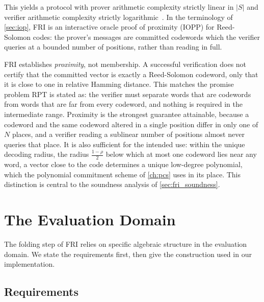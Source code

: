 This yields a protocol with prover arithmetic complexity strictly
linear in $|S|$ and verifier arithmetic complexity strictly
logarithmic~\cite[Section~2.1]{BBHR18}. In the terminology of
\cref{sec:iop}, FRI is an interactive oracle proof of proximity (IOPP)
for Reed-Solomon codes: the prover's messages are committed
codewords which the verifier queries at a bounded number of positions,
rather than reading in full.
 
\begin{remark}
\label{rem:proximity_not_membership}
FRI establishes \emph{proximity}, not membership. A successful
verification does not certify that the committed vector is exactly a
Reed-Solomon codeword, only that it is close to one in relative Hamming
distance. This matches the promise problem RPT is stated as: the
verifier must separate words that are codewords from words that are far
from every codeword, and nothing is required in the intermediate range.
Proximity is the strongest guarantee attainable, because a codeword and
the same codeword altered in a single position differ in only one of
$N$ places, and a verifier reading a sublinear number of positions
almost never queries that place. It is also sufficient for the intended
use: within the unique decoding radius, the radius $\tfrac{1-\rho}{2}$
below which at most one codeword lies near any word, a vector close to
the code determines a unique low-degree polynomial, which the polynomial
commitment scheme of \cref{ch:pcs} uses in its place. This distinction
is central to the soundness analysis of \cref{sec:fri_soundness}.
\end{remark} %
 

 
\section{The Evaluation Domain}
\label{sec:fri_domain}
 
The folding step of FRI relies on specific algebraic structure in the
evaluation domain. We state the requirements first, then give the
construction used in our implementation.
 
 
\subsection{Requirements}
\label{subsec:domain_requirements}
 
